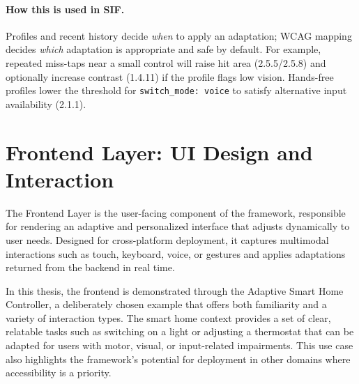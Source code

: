 \paragraph{How this is used in SIF.}
Profiles and recent history decide \emph{when} to apply an adaptation; WCAG mapping decides \emph{which} adaptation is appropriate and safe by default. For example, repeated miss-taps near a small control will raise hit area (2.5.5/2.5.8) and optionally increase contrast (1.4.11) if the profile flags low vision. Hands-free profiles lower the threshold for \texttt{switch\_mode: voice} to satisfy alternative input availability (2.1.1).

\section{Frontend Layer: UI Design and Interaction}
The Frontend Layer is the user-facing component of the framework, responsible for rendering an adaptive and personalized interface that adjusts dynamically to user needs. Designed for cross-platform deployment, it captures multimodal interactions such as touch, keyboard, voice, or gestures and applies adaptations returned from the backend in real time.

In this thesis, the frontend is demonstrated through the Adaptive Smart Home Controller, a deliberately chosen example that offers both familiarity and a variety of interaction types. The smart home context provides a set of clear, relatable tasks such as switching on a light or adjusting a thermostat that can be adapted for users with motor, visual, or input-related impairments. This use case also highlights the framework’s potential for deployment in other domains where accessibility is a priority.

